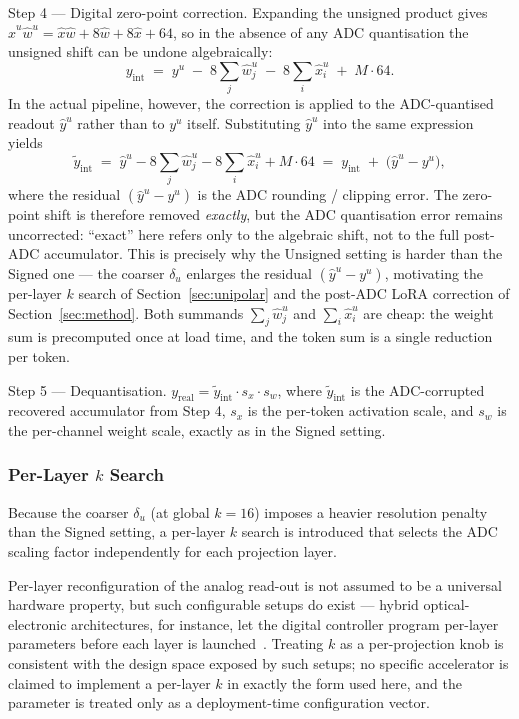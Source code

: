 \documentclass[a4paper,11pt,oneside]{article}
\theoremstyle{breakstyle}
\begin{document}
  Step 4 — Digital zero-point correction.
  Expanding the unsigned product gives
  $\hat{x}^u \hat{w}^u
   = \hat{x}\hat{w} + 8\hat{w} + 8\hat{x} + 64$,
  so in the absence of any ADC quantisation the unsigned shift can be
  undone algebraically:
  \[
    y_{\mathrm{int}} \;=\; y^u
      \;-\; 8\!\sum_j \hat{w}^u_j
      \;-\; 8\!\sum_i \hat{x}^u_i
      \;+\; M \cdot 64.
  \]
  In the actual pipeline, however, the correction is applied to the
  ADC-quantised readout $\hat{y}^u$ rather than to $y^u$ itself.
  Substituting $\hat{y}^u$ into the same expression yields
  \[
    \tilde{y}_{\mathrm{int}}
      \;=\; \hat{y}^u
        - 8\!\sum_j \hat{w}^u_j
        - 8\!\sum_i \hat{x}^u_i
        + M \cdot 64
      \;=\; y_{\mathrm{int}}
            \;+\; \bigl(\hat{y}^u - y^u\bigr),
  \]
  where the residual $(\hat{y}^u - y^u)$ is the ADC rounding / clipping
  error.  The zero-point shift is therefore removed \emph{exactly}, but
  the ADC quantisation error remains uncorrected: ``exact'' here
  refers only to the algebraic shift, not to the full post-ADC
  accumulator.  This is precisely why the Unsigned setting is harder
  than the Signed one --- the coarser $\delta_u$ enlarges the residual
  $(\hat{y}^u - y^u)$, motivating the per-layer $k$ search of
  Section~\ref{sec:unipolar} and the post-ADC LoRA correction of
  Section~\ref{sec:method}.
  Both summands $\sum_j \hat{w}^u_j$ and $\sum_i \hat{x}^u_i$ are
  cheap: the weight sum is precomputed once at load time, and the
  token sum is a single reduction per token.

  Step 5 — Dequantisation.
  $y_{\mathrm{real}} = \tilde{y}_{\mathrm{int}} \cdot s_x \cdot s_w$, where
  $\tilde{y}_{\mathrm{int}}$ is the ADC-corrupted recovered accumulator
  from Step 4, $s_x$ is the per-token activation scale, and $s_w$ is
  the per-channel weight scale, exactly as in the Signed setting.

  \subsubsection{Per-Layer $k$ Search}

  Because the coarser $\delta_u$ (at global $k = 16$) imposes a
  heavier resolution penalty than the Signed setting, a per-layer
  $k$ search is introduced that selects the ADC scaling factor
  independently for each projection layer.

  Per-layer reconfiguration of the analog read-out is not assumed
  to be a universal hardware property, but such configurable setups
  do exist --- hybrid optical-electronic architectures, for
  instance, let the digital controller program per-layer parameters
  before each layer is launched~\cite{Spall2022HybridOptical}.
  Treating $k$ as a per-projection knob is consistent with the
  design space exposed by such setups; no specific accelerator is
  claimed to implement a per-layer $k$ in exactly the form used
  here, and the parameter is treated only as a deployment-time
  configuration vector.
\end{document}
